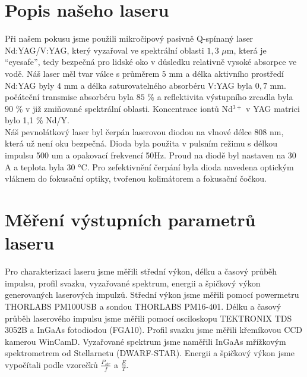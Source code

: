 \documentclass[12pt,a4paper]{article}
\begin{document}
\section{Popis našeho laseru}
Při našem pokusu jsme použili mikročipový pasivně Q-spínaný laser Nd:YAG/V:YAG, který vyzařoval ve spektrální oblasti $1,3$ $\mu$m, která je “eyesafe”, tedy bezpečná pro lidské oko v důsledku relativně vysoké absorpce ve vodě. Náš laser měl tvar válce s průměrem $5$ mm a délka aktivního prostředí Nd:YAG byly $4$ mm a délka saturovatelného absorbéru V:YAG byla $0,7$ mm. počáteční transmise absorbéru byla $85$ \% a reflektivita výstupního zrcadla byla $90$ \% v již zmiňované spektrální oblasti. Koncentrace iontů Nd$^{3+}$ v YAG matrici bylo 1,1 \% Nd/Y. 
\\Náš pevnolátkový laser byl čerpán laserovou diodou na vlnové délce 808 nm, která už není oku bezpečná. Dioda byla použita v pulsním režimu s délkou impulsu 500 um a opakovací frekvencí 50Hz. Proud na diodě byl nastaven na 30 A a teplota byla 30 °C. Pro zefektivnění čerpání byla dioda navedena optickým vláknem do fokusační optiky, tvořenou kolimátorem a fokusační čočkou.

\section{Měření výstupních parametrů laseru}
Pro charakterizaci laseru jsme měřili střední výkon, délku a časový průběh impulsu, profil svazku, vyzařované spektrum, energii a špičkový výkon generovaných laserových impulzů. Střední výkon jsme měřili pomocí powermetru THORLABS PM100USB a sondou THORLABS PM16-401. Délku a časový průběh laserového impulsu jsme měřili pomocí osciloskopu TEKTRONIX TDS 3052B a InGaAs fotodiodou (FGA10). Profil svazku jsme měřili křemíkovou CCD kamerou WinCamD. Vyzařované spektrum jsme naměřili InGaAs mřížkovým spektrometrem od Stellarnetu (DWARF-STAR). Energii a špičkový výkon jsme vypočítali podle vzorečků
$\frac{P_{str}}{f}$ a $\frac{E}{T}$.
\end{document}
